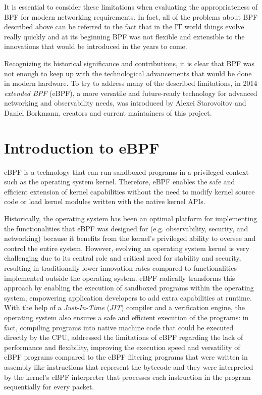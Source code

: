 It is essential to consider these limitations when evaluating the appropriateness of  BPF for modern networking requirements. 
In fact, all of the problems about BPF described above can be referred to the fact that in the IT world things evolve really quickly and at its beginning BPF was not flexible and extensible to the innovations that would be introduced in the years to come.

Recognizing its historical significance and contributions, it is clear that BPF was not enough to keep up with the technological advancements that would be done in modern hardware.
To try to address many of the described limitations, in 2014 \textit{extended BPF} (eBPF), a more versatile and future-ready technology for advanced networking and observability needs, was introduced by Alexei Starovoitov and Daniel Borkmann, creators and current maintainers of this project.

\section{Introduction to eBPF}

eBPF is a technology that can run sandboxed programs in a privileged context such as the operating system kernel.
Therefore, eBPF enables the safe and efficient extension of kernel capabilities without the need to modify kernel source code or load kernel modules written with the native kernel APIs.

Historically, the operating system has been an optimal platform for implementing the functionalities that eBPF was designed for (e.g. observability, security, and networking) because it benefits from the kernel's privileged ability to oversee and control the entire system.
However, evolving an operating system kernel is very challenging due to its central role and critical need for stability and security, resulting in traditionally lower innovation rates compared to functionalities implemented outside the operating system.
eBPF radically transforms this approach by enabling the execution of sandboxed programs within the operating system, empowering application developers to add extra capabilities at runtime. 
With the help of a \textit{Just-In-Time} (\textit{JIT}) compiler and a verification engine, the operating system also ensures a safe and efficient execution of the programs: in fact, compiling programs into native machine code that could be executed directly by the CPU, addressed the limitations of cBPF regarding the lack of performance and flexibility, improving the execution speed and versatility of eBPF programs compared to the cBPF filtering programs that were written in assembly-like instructions that 
represent the bytecode and they were interpreted by the kernel's cBPF interpreter that processes each instruction in the program sequentially for every packet.

